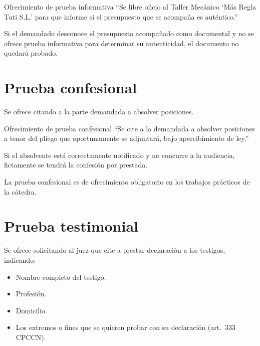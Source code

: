 \documentclass[12pt,oneside]{book}
\begin{document}
\begin{example}{Ofrecimiento de prueba informativa}
``Se libre oficio al Taller Mecánico `Más Regla Tuti S.L.' para que informe si el presupuesto que se acompaña es auténtico.''
\end{example}

\begin{note}
Si el demandado desconoce el presupuesto acompañado como documental y no se ofrece prueba informativa para determinar su autenticidad, el documento no quedará probado.
\end{note}

\section{Prueba confesional}

Se ofrece citando a la parte demandada a absolver posiciones.

\begin{example}{Ofrecimiento de prueba confesional}
``Se cite a la demandada a absolver posiciones a tenor del pliego que oportunamente se adjuntará, bajo apercibimiento de ley.''
\end{example}

\begin{note}
Si el absolvente está correctamente notificado y no concurre a la audiencia, fictamente se tendrá la confesión por prestada.
\end{note}

\begin{important}
La prueba confesional es de ofrecimiento obligatorio en los trabajos prácticos de la cátedra.
\end{important}

\section{Prueba testimonial}

Se ofrece solicitando al juez que cite a prestar declaración a los testigos, indicando:

\begin{itemize}
    \item Nombre completo del testigo.
    \item Profesión.
    \item Domicilio.
    \item Los extremos o fines que se quieren probar con su declaración (art.\ 333 CPCCN).
\end{itemize}
\end{document}
